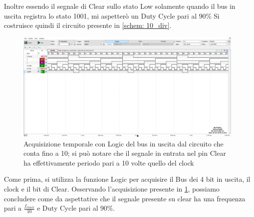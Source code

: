 \documentclass[10pt, a4paper, italian]{article}
\begin{document}
Inoltre essendo il segnale di Clear sullo stato Low solamente quando il bus in uscita registra lo stato 1001, mi aspetterò un Duty Cycle pari al $90 \percent$
Si costruisce quindi il circuito presente in \cref{schem: 10_div}.
\begin{figure}[htbp]
\centering
	\includegraphics[width=\textwidth]{5.e}
	\caption{Acquisizione temporale con Logic del bus in uscita dal circuito che conta fino a 10; si può notare che il segnale in entrata nel pin Clear ha effettivamente periodo pari a 10 volte quello del clock \label{fig: Count_10th}}
\end{figure}
Come prima, si utilizza la funzione Logic per acquisire il Bus dei 4 bit in uscita, il clock e il bit di Clear.
Osservando l'acquisizione presente in \cref{fig: Count_10th}, possiamo concludere come da aspettative che il segnale presente su clear ha una frequenza pari a $\frac{f_{clock}}{10}$ e Duty Cycle pari al $90 \percent$.
\end{document}

